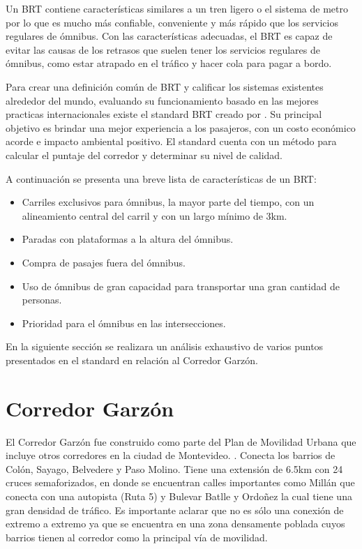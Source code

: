 Un BRT contiene características similares a un tren ligero o el sistema de metro por lo que es mucho más confiable, conveniente y más rápido que los servicios regulares de ómnibus. Con las características adecuadas, el BRT es capaz de evitar las causas de los retrasos que suelen tener los servicios regulares de ómnibus, como estar atrapado en el tráfico y hacer cola para pagar a bordo. 

Para crear una definición común de BRT y calificar los sistemas existentes alrededor del mundo,  evaluando su funcionamiento basado en las mejores practicas internacionales existe el standard BRT creado por \citet{brt_standar}. Su principal objetivo es brindar una mejor experiencia a los pasajeros, con un costo económico acorde e impacto ambiental positivo. El standard cuenta con un método para calcular el puntaje del corredor y determinar su nivel de calidad. 



A continuación se presenta una breve lista de características de un BRT:

\begin{itemize}
	\item Carriles exclusivos para ómnibus, la mayor parte del tiempo, con un alineamiento central del carril y con un largo mínimo de 3km.
	\item Paradas con plataformas a la altura del ómnibus.
	\item Compra de pasajes fuera del ómnibus.
	\item Uso de ómnibus de gran capacidad para transportar una gran cantidad de personas.
	\item Prioridad para el ómnibus en las intersecciones.
\end{itemize}

En la siguiente sección se realizara un análisis exhaustivo de varios puntos presentados en el standard en relación al Corredor Garzón.

	
\section{Corredor Garzón}	


El Corredor Garzón fue construido como parte del Plan de Movilidad Urbana que incluye otros corredores en la ciudad de Montevideo. \citep{PlanMovilidad}. Conecta los barrios de Colón, Sayago, Belvedere y Paso Molino. Tiene una extensión de 6.5km con 24 cruces semaforizados, en donde se encuentran calles importantes como Millán que conecta con una autopista (Ruta 5) y Bulevar Batlle y Ordoñez la cual tiene una gran densidad de tráfico. Es importante aclarar que no es sólo una conexión de extremo a extremo ya que se encuentra en una zona densamente poblada cuyos barrios tienen al corredor como la principal vía de movilidad.

